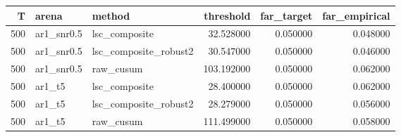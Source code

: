\begin{tabular}{rllrrr}
\toprule
T & arena & method & threshold & far_target & far_empirical \\
\midrule
500 & ar1_snr0.5 & lsc_composite & 32.528000 & 0.050000 & 0.048000 \\
500 & ar1_snr0.5 & lsc_composite_robust2 & 30.547000 & 0.050000 & 0.046000 \\
500 & ar1_snr0.5 & raw_cusum & 103.192000 & 0.050000 & 0.062000 \\
500 & ar1_t5 & lsc_composite & 28.400000 & 0.050000 & 0.062000 \\
500 & ar1_t5 & lsc_composite_robust2 & 28.279000 & 0.050000 & 0.056000 \\
500 & ar1_t5 & raw_cusum & 111.499000 & 0.050000 & 0.058000 \\
\bottomrule
\end{tabular}
